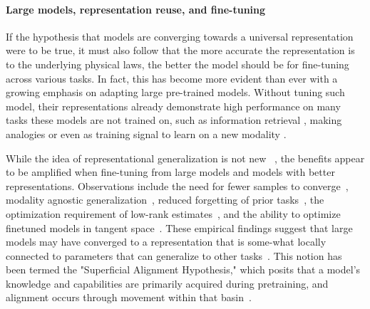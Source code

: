 \documentclass{article}
\theoremstyle{plain}
\theoremstyle{definition}
\theoremstyle{remark}
\begin{document}

\paragraph{Large models, representation reuse, and fine-tuning}
If the hypothesis that models are converging towards a universal representation were to be true, it must also follow that the more accurate the representation is to the underlying physical laws, the better the model should be for fine-tuning across various tasks.
In fact, this has become more evident than ever with a growing emphasis on adapting large pre-trained models. Without tuning such model, their representations already demonstrate high performance on many tasks these models are not trained on, such as information retrieval \citep{babenko2016efficient}, making analogies \citep{mikolov2013efficient} or even as training signal to learn on a new modality \citep{zhai2022lit}. 

While the idea of representational generalization is not new ~\cite{rumelhart1985learning}, the benefits appear to be amplified when fine-tuning from large models and models with better representations. 
Observations include the need for fewer samples to converge~\cite{zhou2023lima,kirstain2021few}, modality agnostic generalization~\cite{lu2021pretrained}, reduced forgetting of prior tasks~\cite{ramasesh2022effect,mehta2021empirical,mirzadeh2022wide}, the optimization requirement of low-rank estimates~\cite{hu2021lora}, and the ability to optimize finetuned models in tangent space~\cite{ortiz2023task}. These empirical findings suggest that large models may have converged to a representation that is some-what locally connected to parameters that can generalize to other tasks~\cite{neyshabur2020being}. This notion has been termed the "Superficial Alignment Hypothesis," which posits that a model's knowledge and capabilities are primarily acquired during pretraining, and alignment occurs through movement within that basin~\cite{zhou2023lima}.
\end{document}
